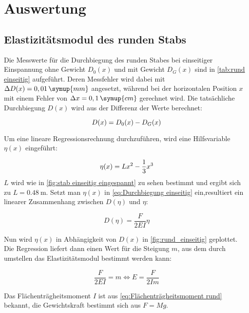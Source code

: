 \section{Auswertung}
\label{sec:Auswertung}

\subsection{Elastizitätsmodul des runden Stabs}  %
\label{sec:Elastizitätsmodul rund}

Die Messwerte für die Durchbiegung des runden Stabes bei einseitiger Einspannung ohne Gewicht $D_{0}(x)$
und mit Gewicht $D_{G}(x)$ sind in \autoref{tab:rund einseitig} aufgeführt.
Deren Messfehler wird dabei mit $\Delta D(x) =  0,01\,\symup{mm}$ angesetzt, während bei der horizontalen Position
$x$ mit einem Fehler von $\Delta x = 0,1\,\symup{cm}$ gerechnet wird.
Die tatsächliche Durchbiegung $D(x)$ wird aus der Differenz der Werte berechnet:

\begin{equation}
  D(x)= D_{0}(x)-D_{G}(x) \notag
  \label{eq:Delta D}
\end{equation}


Um eine lineare Regressionsrechnung durchzuführen, wird eine Hilfsvariable $\eta(x)$ eingeführt:

\begin{equation}
  \eta(x)=Lx^{2}-\frac{1}{3}x^{3} \notag
  \label{eq:eta einseitig rund}
\end{equation}
$L$ wird wie in \autoref{fig:stab einseitig eingespannt} zu sehen bestimmt und ergibt sich zu $L=\qty{0,48}{\metre}$.
Setzt man $\eta(x)$ in \autoref{eq:Durchbiegung einseitig} ein,resultiert ein linearer Zusammenhang zwischen $D(\eta)$ und $\eta$:

\begin{equation}
  D(\eta)=\frac{F}{2EI}\eta
  \label{eq:Geradengleichung}
\end{equation}

Nun wird $\eta(x)$ in Abhängigkeit von $D(x)$ in \autoref{fig:rund_einseitig} geplottet.
Die Regression liefert dann einen Wert für die Steigung $m$, aus dem durch umstellen das Elastizitätsmodul bestimmt werden kann:

\begin{equation}
  \frac{F}{2EI}=m \Leftrightarrow E=\frac{F}{2Im}
  \label{eq:Elastizitätsmodul aus Steigung}
\end{equation}

Das Flächenträgheitsmoment $I$ ist aus \autoref{eq:Flächenträgheitsmoment rund} bekannt, die Gewichtskraft
bestimmt sich aus $F=Mg$.

